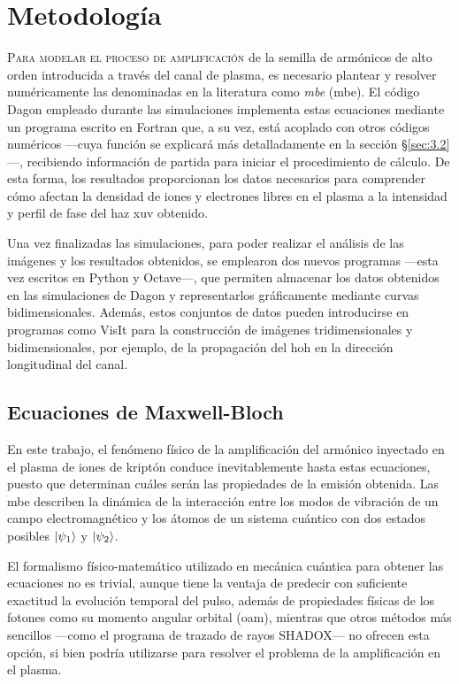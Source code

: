 \chapter{Metodología}\label{cap:3}
\lettrine{P}{ara modelar el proceso de amplificación} de la semilla de armónicos de alto orden introducida a través del canal de plasma, es necesario plantear y resolver numéricamente las denominadas en la literatura como \emph{\acrlong{mbe}} (\acrshort{mbe}). El código Dagon empleado durante las simulaciones implementa estas ecuaciones mediante un programa escrito en Fortran que, a su vez, está acoplado con otros códigos numéricos ---cuya función se explicará más detalladamente en la sección \S\ref{sec:3.2}---, recibiendo información de partida para iniciar el procedimiento de cálculo. De esta forma, los resultados proporcionan los datos necesarios para comprender cómo afectan la densidad de iones y electrones libres en el plasma a la intensidad y perfil de fase del haz \acrshort{xuv} obtenido. 

Una vez finalizadas las simulaciones, para poder realizar el análisis de las imágenes y los resultados obtenidos, se emplearon dos nuevos programas ---esta vez escritos en Python y Octave---, que permiten almacenar los datos obtenidos en las simulaciones de Dagon y representarlos gráficamente mediante curvas bidimensionales. Además, estos conjuntos de datos pueden introducirse en programas como VisIt para la construcción de imágenes tridimensionales y bidimensionales, por ejemplo, de la propagación del \acrshort{hoh} en la dirección longitudinal del canal.

\section{Ecuaciones de Maxwell-Bloch}\label{sec:3.1}
En este trabajo, el fenómeno físico de la amplificación del armónico inyectado en el plasma de iones de kriptón conduce inevitablemente hasta estas ecuaciones, puesto que determinan cuáles serán las propiedades de la emisión obtenida. Las \acrshort{mbe} describen la dinámica de la interacción entre los modos de vibración de un campo electromagnético y los átomos de un sistema cuántico con dos estados posibles $\left|\psi_{1}\right\rangle$ y $\left|\psi_{2}\right\rangle$. 

El formalismo físico-matemático utilizado en mecánica cuántica para obtener las ecuaciones no es trivial\autocite{cohen-tannoudjiQuantumMechanicsVolume2019a,Sakurai2020,milonniLasers1988}, aunque tiene la ventaja de predecir con suficiente exactitud la evolución temporal del pulso, además de propiedades físicas de los fotones como su momento angular orbital (\acrshort{oam}), mientras que otros métodos más sencillos ---como el programa de trazado de rayos SHADOX--- no ofrecen esta opción, si bien podría utilizarse para resolver el problema de la amplificación en el plasma. 

